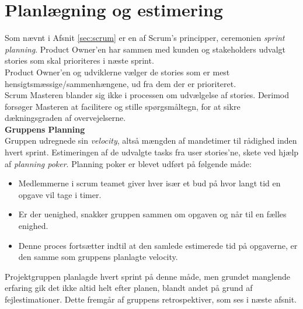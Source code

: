 \section{Planlægning og estimering}\label{sec:planning}
Som nævnt i Afsnit \ref{sec:scrum} er en af Scrum's principper, ceremonien \textit{sprint planning}.
Product Owner’en har sammen med kunden og stakeholders udvalgt stories som skal prioriteres i næste sprint.\\ 

Product Owner’en og udviklerne vælger de stories som er mest hensigtsmæssige/sammenhængene, ud fra dem der er prioriteret.\\

Scrum Masteren blander sig ikke i processen om udvælgelse af stories. Derimod forsøger Masteren at facilitere og stille spørgsmåltegn, 
for at sikre dækningsgraden af overvejelserne.\\

\textbf{Gruppens Planning}\\
Gruppen udregnede sin \textit{velocity}, altså mængden af mandetimer til rådighed inden hvert sprint.
Estimeringen af de udvalgte tasks fra user stories'ne, skete ved hjælp af \textit{planning poker}. Planning poker er blevet udført på følgende måde:

\begin{itemize}
    \item Medlemmerne i scrum teamet giver hver især et bud på hvor langt tid en opgave vil tage i timer.
    \item Er der uenighed, snakker gruppen sammen om opgaven og når til en fælles enighed.
    \item Denne proces fortsætter indtil at den samlede estimerede tid på opgaverne, er den samme som gruppens planlagte velocity.
\end{itemize}

Projektgruppen planlagde hvert sprint på denne måde, men grundet manglende erfaring gik det ikke altid helt efter planen, blandt andet på grund
af fejlestimationer. Dette fremgår af gruppens retrospektiver, som ses i næste afsnit.